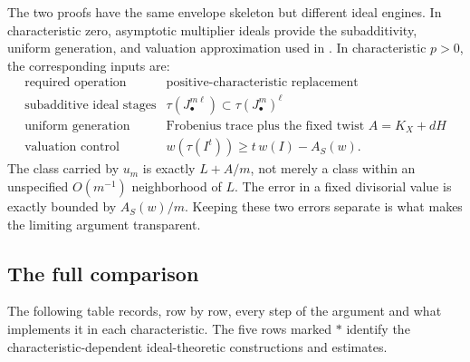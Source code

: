 The two proofs have the same envelope skeleton but different ideal
engines.  In characteristic zero, asymptotic multiplier ideals provide the
subadditivity, uniform generation, and valuation approximation used in
\cite{BJ22b}.  In characteristic $p>0$, the corresponding inputs are:
\[
\begin{array}{c|c}
\text{required operation} & \text{positive-characteristic replacement}\\
\hline
\text{subadditive ideal stages}
  & \tau(J_\bullet^{m\ell})\subset\tau(J_\bullet^m)^\ell\\
\text{uniform generation}
  & \text{Frobenius trace plus the fixed twist }A=K_X+dH\\
\text{valuation control}
  & w(\tau(I^t))\ge t\,w(I)-A_S(w).
\end{array}
\]
The class carried by $u_m$ is exactly $L+A/m$, not merely a class
within an unspecified $O(m^{-1})$ neighborhood of $L$.  The error in a
fixed divisorial value is exactly bounded by $A_S(w)/m$.  Keeping these
two errors separate is what makes the limiting argument transparent.

\subsection{The full comparison}
\label{sec:ch40-comparison-table}

The following table records, row by row, every step of the argument and what
implements it in each characteristic.  The five rows marked $\ast$ identify
the characteristic-dependent ideal-theoretic constructions and estimates.


